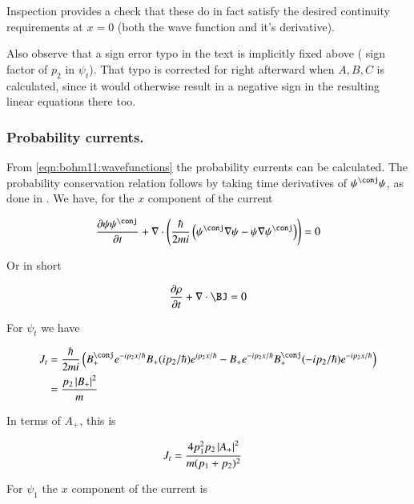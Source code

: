Inspection provides a check that these do in fact satisfy the desired
continuity requirements at $x=0$ (both the wave function and it's derivative).

Also observe that a sign error typo in the text is implicitly fixed above (
sign factor of $p_2$ in $\psi_t$).  That typo is corrected for right afterward when $A,B,C$ is calculated, since it would otherwise result in a negative sign in the resulting linear equations there too.

\subsubsection{Probability currents. }

From \ref{eqn:bohm11:wavefunctions}
the probability currents can be calculated.  The probability
conservation relation follows by taking time derivatives of $\psi^\conj\psi$, as done in \citep{PJprobCurrent}.  We have, for the $x$ component of the current

\begin{align*}
\PD{t}{\psi\psi^\conj} + \grad \cdot \left(
\frac{\hbar}{2 m i}
\left(
\psi^\conj \grad \psi
-\psi \grad \psi^\conj
\right)
\right) = 0
\end{align*}

Or in short

\begin{align*}
\PD{t}{\rho} + \grad \cdot \BJ = 0
\end{align*}

For $\psi_t$ we have

\begin{align*}
J_t
&=
\frac{\hbar}{2 m i}
\left(
B_{+}^\conj e^{ -i p_2 x/\hbar }
B_{+} (i p_2 /\hbar)e^{ i p_2 x/\hbar }
-B_{+} e^{ -i p_2 x/\hbar }
B_{+}^\conj (-i p_2 /\hbar)e^{ -i p_2 x/\hbar }
\right) \\
&= \frac{ p_2 \Abs{ B_{+} }^2}{m } \\
\end{align*}

In terms of $A_{+}$, this is

\begin{align}\label{eqn:bohm11:currentTransmitted}
J_t &= \frac{ 4 p_1^2 p_2 \left\lvert{ A_{+} }\right\rvert^2}{m (p_1 + p_2)^2}
\end{align}

For $\psi_1$ the $x$ component of the current is

